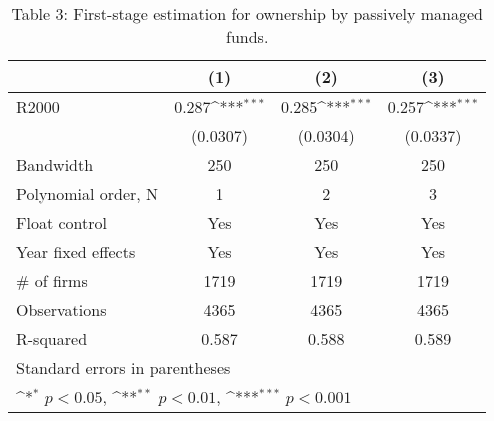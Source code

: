 \begin{table}[htbp]\centering
\def\sym#1{\ifmmode^{#1}\else\(^{#1}\)\fi}
\caption{Table 3: First-stage estimation for ownership by passively managed funds.}
\begin{tabular}{l*{3}{c}}
\hline\hline
                    &\multicolumn{1}{c}{(1)}         &\multicolumn{1}{c}{(2)}         &\multicolumn{1}{c}{(3)}         \\
\hline
R2000               &       0.287\sym{***}&       0.285\sym{***}&       0.257\sym{***}\\
                    &    (0.0307)         &    (0.0304)         &    (0.0337)         \\
\hline
Bandwidth           &         250         &         250         &         250         \\
Polynomial order, N &           1         &           2         &           3         \\
Float control       &         Yes         &         Yes         &         Yes         \\
Year fixed effects  &         Yes         &         Yes         &         Yes         \\
# of firms          &        1719         &        1719         &        1719         \\
Observations        &        4365         &        4365         &        4365         \\
R-squared           &       0.587         &       0.588         &       0.589         \\
\hline\hline
\multicolumn{4}{l}{\footnotesize Standard errors in parentheses}\\
\multicolumn{4}{l}{\footnotesize \sym{*} \(p<0.05\), \sym{**} \(p<0.01\), \sym{***} \(p<0.001\)}\\
\end{tabular}
\end{table}
